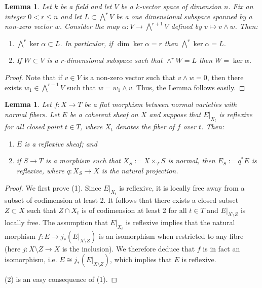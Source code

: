 \documentclass[12pt]{amsart}
\numberwithin{equation}{section}
\newtheorem{lem}[thm]{Lemma}
\theoremstyle{definition}
\theoremstyle{definition}
\theoremstyle{definition}
\begin{document}
\begin{lem}
\label{lem_linear_algebra}
Let $k$ be a field and let $V$ be a $k$-vector space of dimension $n$.  Fix an integer $0<r\leq n$ and let $L \subset \bigwedge^r V$ be a one 
dimensional subspace spanned by a non-zero vector $w$.
Consider the map $\alpha\colon V \to \bigwedge^{r+1} V$ defined by $v \mapsto v\wedge w$.
Then:
\begin{enumerate}
\item $\bigwedge^r \ker \alpha \subset L$.  In particular, if $\dim \ker \alpha = r$ then $\bigwedge^r \ker \alpha = L$.

\item If $W\subset V$ is a $r$-dimensional subspace such that $\wedge^r W=L$ then $W=\ker \alpha$.
\end{enumerate}
\end{lem}
\begin{proof}
Note that if $v\in V$ is a non-zero vector such that $v\wedge w=0$, then there exists $w_1\in \bigwedge^{r-1} V$ such that $w= w_1\wedge v$. Thus, the Lemma follows easily. 
\end{proof}


\begin{lem}
Let $f\colon X \to T$ be a flat morphism between normal varieties with normal fibers.  Let $E$ be a coherent sheaf on $X$ and suppose that 
$E\vert_{X_t}$ is reflexive for all closed point $t \in T$, where $X_t$ denotes the fiber of $f$ over $t$.  Then:
\begin{enumerate}
    \item $E$ is a reflexive sheaf; and 
    \item if $S \to T$ is a morphism such that $X_S:= X\times_TS$ is normal, then $E_S := q^*E$ is reflexive,
    where $q\colon X_S \to X$ is the natural projection.
\end{enumerate}
\end{lem}
\begin{proof}
We first prove (1).  Since $E\vert_{X_t}$ is reflexive, it is locally free away from a subset of codimension at least 2.  It follows that there exists a closed subset $Z \subset X$ such that
$Z \cap X_t$ is of codimension at least 2 for all $t \in T$ and $E\vert_{X\setminus Z}$ is locally free. 
The assumption that $E\vert_{X_t}$ is reflexive implies that the natural morphism $f\colon E \to j_*(E\vert_{X\setminus Z})$
is an isomorphism when restricted to any fibre (here $j\colon X\setminus Z \to X$ is the inclusion).  We therefore deduce that $f$ is in fact an isomorphism, i.e. $E \cong j_*(E\vert_{X\setminus Z})$, which implies that $E$ is reflexive. 

    (2) is an easy consequence of (1).
\end{proof}
\end{document}
